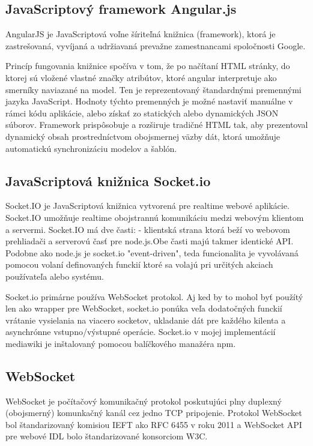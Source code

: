\subsection{JavaScriptový framework Angular.js}
AngularJS je JavaScriptová voľne šíriteľná knižnica (framework), ktorá je zastrešovaná, vyvíjaná a udržiavaná prevažne zamestnancami spoločnosti Google. 

Princíp fungovania knižnice spočíva v tom, že po načítaní HTML stránky, do ktorej sú vložené vlastné značky atribútov, ktoré angular interpretuje ako smerníky naviazané na model. Ten je reprezentovaný štandardnými premennými jazyka JavaScript. Hodnoty týchto premenných je možné nastaviť manuálne v rámci kódu aplikácie, alebo získať zo statických alebo dynamických JSON súborov. Framework prispôsobuje a rozširuje tradičné HTML tak, aby prezentoval dynamický obsah prostredníctvom obojsmernej väzby dát, ktorá umožňuje automatickú synchronizáciu modelov a šablón.

\subsection{JavaScriptová knižnica Socket.io}
Socket.IO je JavaScriptová knižnica vytvorená pre realtime webové aplikácie. Socket.IO umožňuje realtime obojstrannú komunikáciu medzi webovým klientom a servermi. Socket.IO má dve časti:
- klientská strana ktorá beží vo webovom prehliadači a serverovú časť pre node.js.Obe časti majú takmer identické API. Podobne ako node.js je socket.io "event-driven", teda funcionalita je vyvolávaná pomocou volaní definovaných funckií ktoré sa volajú pri určitých akciach používateľa alebo systému.

Socket.io primárne používa WebSocket protokol. Aj ked by to mohol byť použítý len ako wrapper pre WebSocket, socket.io ponúka veľa dodatočných funckií vrátanie vysielania na viacero socketov, ukladanie dát pre každého kilenta a asynchrónne vstupno/výstupné operácie.
Socket.io v mojej implementácií mediawiki je inštalovaný pomocou balíčkového manažéra npm.

\subsection{WebSocket}
WebSocket je počítačový komunikačný protokol poskutujúci plny duplexný (obojsmerný)  komunkačný kanál cez jedno TCP pripojenie.
Protokol WebSocket bol štandarizovaný komisiou IEFT ako RFC 6455 v roku 2011 a WebSocket API pre webové IDL bolo štandarizované konsorciom W3C.

